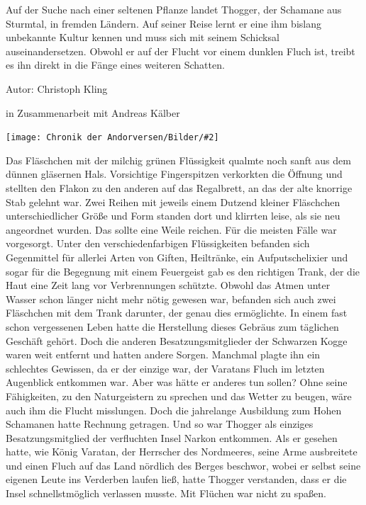 \documentclass[10pt, a4paper, oneside]{book}
\newcommand{\bildmitts}[2][height=0.32\textwidth,width=0.48\textwidth,keepaspectratio]{%
    \begin{center}
        \texttt{[image: Chronik der Andorversen/Bilder/\#2]}
    \end{center}
}
\begin{document}
\begin{multicols}{2}
Auf der Suche nach einer seltenen Pflanze landet Thogger, der Schamane aus Sturmtal, in fremden Ländern. Auf seiner Reise lernt er eine ihm bislang unbekannte Kultur kennen und muss sich mit seinem Schicksal auseinandersetzen. Obwohl er auf der Flucht vor einem dunklen Fluch ist, treibt es ihn direkt in die Fänge eines weiteren Schatten.\bigskip

Autor: Christoph Kling

in Zusammenarbeit mit Andreas Kälber\bigskip

\bildmitts{Hoffnung und Schicksal Bild 1.jpg}

Das Fläschchen mit der milchig grünen Flüssigkeit qualmte noch sanft aus dem dünnen gläsernen Hals. Vorsichtige Fingerspitzen verkorkten die Öffnung und stellten den Flakon zu den anderen auf das Regalbrett, an das der alte knorrige Stab gelehnt war. Zwei Reihen mit jeweils einem Dutzend kleiner Fläschchen unterschiedlicher Größe und Form standen dort und klirrten leise, als sie neu angeordnet wurden. Das sollte eine Weile reichen. Für die meisten Fälle war vorgesorgt. Unter den verschiedenfarbigen Flüssigkeiten befanden sich Gegenmittel für allerlei Arten von Giften, Heiltränke, ein Aufputschelixier und sogar für die Begegnung mit einem Feuergeist gab es den richtigen Trank, der die Haut eine Zeit lang vor Verbrennungen schützte. Obwohl das Atmen unter Wasser schon länger nicht mehr nötig gewesen war, befanden sich auch zwei Fläschchen mit dem Trank darunter, der genau dies ermöglichte. In einem fast schon vergessenen Leben hatte die Herstellung dieses Gebräus zum täglichen Geschäft gehört. Doch die anderen Besatzungsmitglieder der Schwarzen Kogge waren weit entfernt und hatten andere Sorgen. Manchmal plagte ihn ein schlechtes Gewissen, da er der einzige war, der Varatans Fluch im letzten Augenblick entkommen war. Aber was hätte er anderes tun sollen? Ohne seine Fähigkeiten, zu den Naturgeistern zu sprechen und das Wetter zu beugen, wäre auch ihm die Flucht misslungen. Doch die jahrelange Ausbildung zum Hohen Schamanen hatte Rechnung getragen. Und so war Thogger als einziges Besatzungsmitglied der verfluchten Insel Narkon entkommen. Als er gesehen hatte, wie König Varatan, der Herrscher des Nordmeeres, seine Arme ausbreitete und einen Fluch auf das Land nördlich des Berges beschwor, wobei er selbst seine eigenen Leute ins Verderben laufen ließ, hatte Thogger verstanden, dass er die Insel schnellstmöglich verlassen musste. Mit Flüchen war nicht zu spaßen.\bigskip


\end{multicols}
\end{document}
